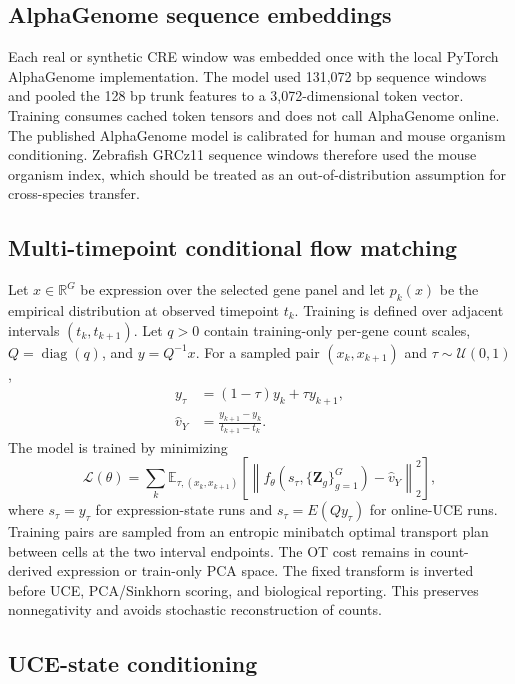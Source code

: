\documentclass[11pt]{article}
\newcommand{\uce}{UCE}
\newcommand{\ag}{AlphaGenome}
\begin{document}
\subsection{AlphaGenome sequence embeddings}

Each real or synthetic CRE window was embedded once with the local PyTorch
\ag{} implementation. The model used 131,072 bp sequence windows and pooled the
128 bp trunk features to a 3,072-dimensional token vector. Training consumes
cached token tensors and does not call \ag{} online. The published \ag{} model
is calibrated for human and mouse organism conditioning. Zebrafish GRCz11
sequence windows therefore used the mouse organism index, which should be
treated as an out-of-distribution assumption for cross-species transfer.

\subsection{Multi-timepoint conditional flow matching}

Let $x \in \mathbb{R}^{G}$ be expression over the selected gene panel and let
$p_k(x)$ be the empirical distribution at observed timepoint $t_k$. Training is
defined over adjacent intervals $(t_k,t_{k+1})$. Let $q>0$ contain
training-only per-gene count scales, $Q=\operatorname{diag}(q)$, and
$y=Q^{-1}x$. For a sampled pair $(x_k,x_{k+1})$ and
$\tau \sim \mathcal{U}(0,1)$,
\begin{align}
y_\tau &= (1-\tau)y_k + \tau y_{k+1}, \\
\hat v_Y &= \frac{y_{k+1}-y_k}{t_{k+1}-t_k}.
\end{align}
The model is trained by minimizing
\begin{equation}
\mathcal{L}(\theta)=
\sum_{k}
\mathbb{E}_{\tau,(x_k,x_{k+1})}
\left[
\left\| f_\theta(s_\tau,\{\mathbf{Z}_g\}_{g=1}^{G})-\hat v_Y \right\|_2^2
\right],
\end{equation}
where $s_\tau=y_\tau$ for expression-state runs and
$s_\tau=E(Qy_\tau)$ for online-\uce{} runs. Training pairs are sampled from an entropic minibatch
optimal transport plan between cells at the two interval endpoints. The OT cost
remains in count-derived expression or train-only PCA space. The fixed
transform is inverted before \uce{}, PCA/Sinkhorn scoring, and biological
reporting. This preserves nonnegativity and avoids stochastic reconstruction
of counts.

\subsection{UCE-state conditioning}
\end{document}
